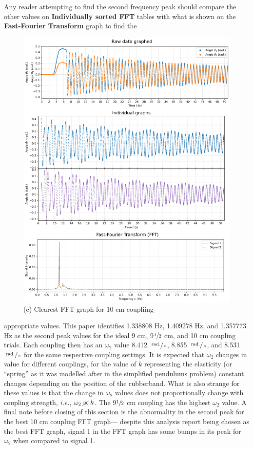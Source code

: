 \documentclass[12pt]{article}
\newcommand{\s}{\;\mathrm{s}}
\newcommand{\radian}{\;\mathrm{rad.}}
\begin{document}
\begin{multicols}{2}
Any reader attempting to find the second frequency peak should compare the other values on \textbf{Individually sorted FFT} tables with what is shown on the \textbf{Fast-Fourier Transform} graph to find the
\newpage
\begin{figure}[H]
    \centering
    \includegraphics[width=0.98\linewidth]{figs/beat (left_10_2)_cropped.png}   
    \captionsetup{labelformat=empty}
    \caption{(c) Clearest FFT graph for 10 cm coupliing}
\end{figure}
\noindent
appropriate values.
This paper identifies 1.338808 Hz, 1.409278 Hz, and 1.357773 Hz as the second peak values for the ideal 9 cm, 9$\sfrac{1}{2}$ cm, and 10 cm coupling trials.
Each coupling then has an $\omega_2$ value 8.412 $\sfrac{\radian}{\s}$, 8.855 $\sfrac{\radian}{\s}$, and 8.531 $\sfrac{\radian}{\s}$ for the same respective coupling settings.
It is expected that $\omega_2$ changes in value for different couplings, for the value of $k$ representing the elasticity (or ``spring'' as it was modelled after in the simplified pendulums problem) constant changes depending on the position of the rubberband.
What is also strange for these values is that the change in $\omega_2$ values does not proportionally change with coupling strength, \textit{i.e.}, $\omega_2\; \cancel{\propto}\; k$.
The 9$\sfrac{1}{2}$ cm coupling has the highest $\omega_2$ value.
A final note before closing of this section is the abnormality in the second peak for the best 10 cm coupling FFT graph---
despite this analysis report being chosen as the best FFT graph, signal 1 in the FFT graph has some bumps in its peak for $\omega_2$ when compared to signal 1.


\end{multicols}
\end{document}
